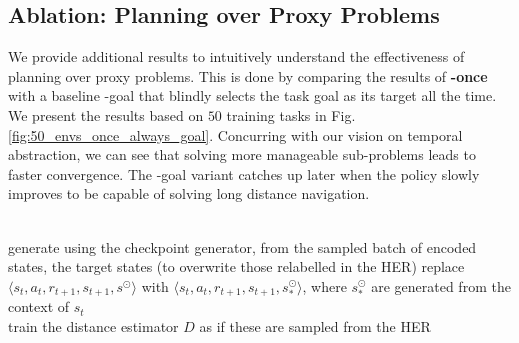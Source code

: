 \subsection{Ablation: Planning over Proxy Problems}
We provide additional results to intuitively understand the effectiveness of planning over proxy problems. This is done by comparing the results of \textbf{\agentshort{}-once} with a baseline \agentshort{}-goal that blindly selects the task goal as its target all the time. We present the results based on $50$ training tasks in Fig. \ref{fig:50_envs_once_always_goal}. Concurring with our vision on temporal abstraction, we can see that solving more manageable sub-problems leads to faster convergence. The \agentshort{}-goal variant catches up later when the policy slowly improves to be capable of solving long distance navigation.

\begin{figure*}[htbp]
\centering
\hfill
{}
\hfill
{}
\hfill
{}
\hfill
{}

\caption{\small \textbf{Effectiveness of Proxy Problem based Planning}: each agent is trained with $50$ environments and each curve is processed from $20$ independent seed runs.}
\label{fig:50_envs_once_always_goal}
\end{figure*}

\begin{algorithm*}[htbp]
\caption{Delusion Suppression}
\label{alg:suppress}

\\

generate using the checkpoint generator, from the sampled batch of encoded states, the target states (to overwrite those relabelled in the HER) \ie{} replace $\langle s_t, a_t, r_{t+1}, s_{t+1}, s^{\odot} \rangle$ with $\langle s_t, a_t, r_{t+1}, s_{t+1}, s^{\odot}_* \rangle$, where $s^{\odot}_*$ are generated from the context of $s_t$\\

train the distance estimator $D$ as if these are sampled from the HER\\

\end{algorithm*}


